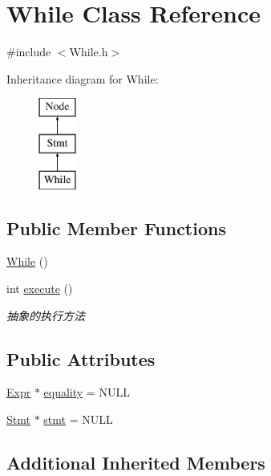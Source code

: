 \hypertarget{class_while}{}\section{While Class Reference}
\label{class_while}


{\ttfamily \#include $<$While.\+h$>$}

Inheritance diagram for While\+:\begin{figure}[H]
\begin{center}
\leavevmode
\includegraphics[height=3.000000cm]{class_while}
\end{center}
\end{figure}
\subsection*{Public Member Functions}
\begin{DoxyCompactItemize}
\item 
\hyperlink{class_while_aacee45c95a102a5a1ec711bbc29c92a7}{While} ()
\item 
int \hyperlink{class_while_a23b58565983130bb54577f4399ffd822}{execute} ()
\begin{DoxyCompactList}\small\item\em 抽象的执行方法 \end{DoxyCompactList}\end{DoxyCompactItemize}
\subsection*{Public Attributes}
\begin{DoxyCompactItemize}
\item 
\hyperlink{class_expr}{Expr} $\ast$ \hyperlink{class_while_a14af77714254099c0cc465944ef67dd3}{equality} = N\+U\+LL
\item 
\hyperlink{class_stmt}{Stmt} $\ast$ \hyperlink{class_while_a97dfbf50f27b969c5b765ecfb1ef4ac2}{stmt} = N\+U\+LL
\end{DoxyCompactItemize}
\subsection*{Additional Inherited Members}


